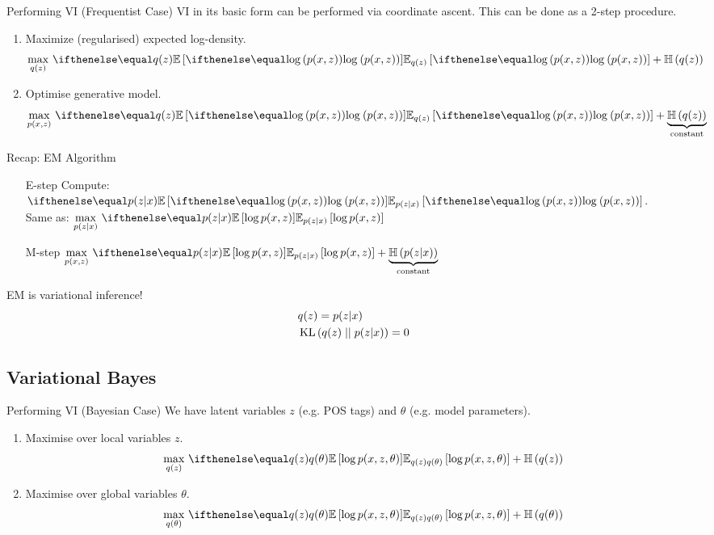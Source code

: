 \documentclass[14pt]{beamer}
\begin{document}
\begin{frame}{Performing VI (Frequentist Case)}
VI in its basic form can be performed via coordinate ascent. This can be done as a 2-step procedure.
\begin{enumerate}
\pause
\item Maximize (regularised) expected log-density.
\begin{equation*}
\underset{q(z)}{\max}~\E[q(z)]{\loga{p(x,z)}} + \Ent{q(z)}
\end{equation*}
\pause
\item Optimise generative model.
\begin{equation*}
\underset{p(x,z)}{\max}~ \E[q(z)]{\loga{p(x,z)}} + \underbrace{\Ent{q(z)}}_{\text{constant}}
\end{equation*}
\end{enumerate}
\end{frame}

\begin{frame}{Recap: EM Algorithm}
\begin{itemize}
\item[\alert{E-step}] Compute: $ \E[p(z|x)]{\loga{p(x,z)}} $. \\ Same as: $ \underset{p(z|x)}{\max}~ \E[p(z|x)]{\log p(x,z)} $
\item[\alert{M-step}] $ \underset{p(x,z)}{\max}~\E[p(z|x)]{\log p(x,z)} + \underbrace{\Ent{p(z|x)}}_{\text{constant}} $
\end{itemize}
\pause 
\begin{block}{EM is variational inference!}
\begin{align*}
&q(z) = p(z|x) \\
&\operatorname{KL}\left(q(z)\mid\mid p(z|x)\right) = 0
\end{align*}
\end{block}
\end{frame}


\subsection{Variational Bayes}

\begin{frame}{Performing VI (Bayesian Case)}
We have latent variables $ z $ (e.g. POS tags) and $ \theta $ (e.g. model parameters).
\begin{enumerate}
\item Maximise over local variables $ z $.
\begin{equation*}
\underset{q(z)}{\max}~\E[q(z)q(\theta)]{\log p(x,z,\theta)} + \Ent{q(z)}
\end{equation*}
\pause
\item Maximise over global variables $ \theta $.
\begin{equation*}
\underset{q(\theta)}{\max}~ \E[q(z)q(\theta)]{\log p(x,z,\theta)} + \Ent{q(\theta)}
\end{equation*}
\end{enumerate}
\end{frame}
\end{document}
